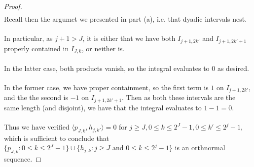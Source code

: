 \documentclass[12pt]{article}
\newenvironment{ex}[2][Exercise]{\begin{trivlist}
\item[\hskip \labelsep {\bfseries #1}\hskip \labelsep {\bfseries #2.}]}{\end{trivlist}}
\begin{document}
\begin{ex}{14}
\begin{enumerate}
\begin{proof}
\begin{align*}
            \end{align*}
            Recall then the argumet we presented in part (a), i.e. that dyadic intervals nest. \\ \\
            In particular, as $j + 1 > J$, it is either that we have both $I_{j + 1, 2k'}$ and $I_{j + 1, 2k' + 1}$ properly contained in $I_{J,k}$, or neither is. \\ \\
            In the latter case, both products vanish, so the integral evaluates to 0 as desired. \\ \\
            In the former case, we have proper containment, so the first term is $1$ on $I_{j + 1, 2k'}$, and the the second is $-1$ on $I_{j + 1, 2k' + 1}$. Then as both these intervals are the same length (and disjoint), we have that the integral evaluates to $1 - 1 = 0$. \\ \\
            Thus we have verified  $\langle p_{J,k}, h_{j,k'} \rangle = 0$ for $j \geq J, 0 \leq k \leq 2^J - 1, 0 \leq k' \leq 2^j - 1$, which is sufficient to conclude that $\{p_{J,k} : 0 \leq k \leq 2^J - 1\} \cup \{h_{j, k} : j \geq J \text{ and } 0 \leq k \leq 2^j - 1\}$ is an orthnormal sequence.


\end{proof}
\end{enumerate}
\end{ex}
\end{document}

